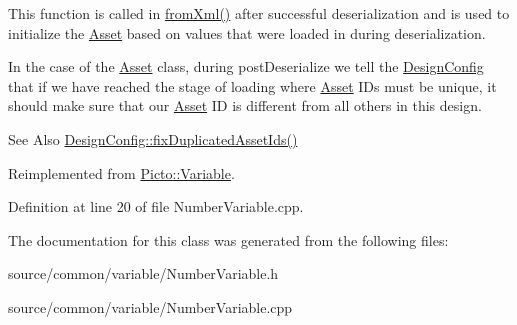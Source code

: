 This function is called in \hyperlink{class_picto_1_1_asset_a8bed4da09ecb1c07ce0dab313a9aba67}{from\-Xml()} after successful deserialization and is used to initialize the \hyperlink{class_picto_1_1_asset}{Asset} based on values that were loaded in during deserialization. 

In the case of the \hyperlink{class_picto_1_1_asset}{Asset} class, during post\-Deserialize we tell the \hyperlink{class_picto_1_1_design_config}{Design\-Config} that if we have reached the stage of loading where \hyperlink{class_picto_1_1_asset}{Asset} I\-Ds must be unique, it should make sure that our \hyperlink{class_picto_1_1_asset}{Asset} I\-D is different from all others in this design. \begin{DoxySeeAlso}{See Also}
\hyperlink{class_picto_1_1_design_config_ab57e0738b97e4358ab09530cd6815fc0}{Design\-Config\-::fix\-Duplicated\-Asset\-Ids()} 
\end{DoxySeeAlso}


Reimplemented from \hyperlink{class_picto_1_1_variable_a447e12ef138cdd99ae9ba870ed3b5174}{Picto\-::\-Variable}.



Definition at line 20 of file Number\-Variable.\-cpp.



The documentation for this class was generated from the following files\-:\begin{DoxyCompactItemize}
\item 
source/common/variable/Number\-Variable.\-h\item 
source/common/variable/Number\-Variable.\-cpp\end{DoxyCompactItemize}
